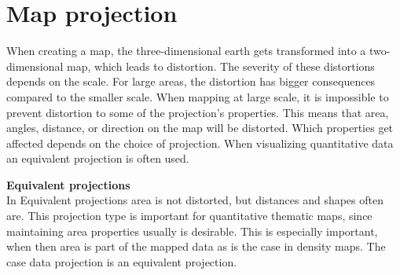 \citep{LightIsLess} %





\section{Map projection}
When creating a map, the three-dimensional earth gets transformed into a two-dimensional map, which leads to distortion. The severity of these distortions depends on the scale. For large areas, the distortion has bigger consequences compared to the smaller scale. When mapping at large scale, it is impossible to prevent distortion to some of the projection’s properties. This means that area, angles, distance, or direction on the map will be distorted. Which properties get affected depends on the choice of projection. When visualizing quantitative data an equivalent projection is often used. 

\textbf{Equivalent projections}\\
In Equivalent projections area is not distorted, but distances and shapes often are. This projection type is important for quantitative thematic maps, since maintaining area properties usually is desirable. This is especially important, when then area is part of the mapped data as is the case in density maps.
The case data projection is an equivalent projection.


%
%
%
%
















